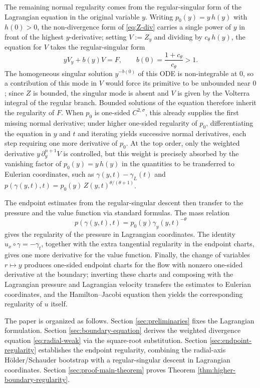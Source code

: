 \documentclass[11pt]{amsart}
\begin{document}
The remaining normal regularity comes from the regular-singular form of
the Lagrangian equation in the original variable \(y\). Writing
\(p_0(y)=y\,h(y)\) with \(h(0)>0\), the non-divergence form of
\eqref{eq:Z-div} carries a single power of \(y\) in front of the highest
\(y\)-derivative; setting \(V:=Z_y\) and dividing by \(c_\theta\,h(y)\),
the equation for \(V\) takes the regular-singular form
\[
        y V_y+b(y)V=F,\qquad
        b(0)=\frac{1+c_\theta}{c_\theta}>1 .
\]
The homogeneous singular solution \(y^{-b(0)}\) of this ODE is
non-integrable at \(0\), so a contribution of this mode in \(V\) would
force its primitive to be unbounded near \(0\); since \(Z\) is bounded,
the singular mode is absent and \(V\) is given by the Volterra integral
of the regular branch. Bounded solutions of the equation therefore
inherit the regularity of \(F\). When \(p_0\) is one-sided
\(C^{2,\sigma}\), this already supplies the first missing normal
derivative; under higher one-sided regularity of \(p_0\), differentiating
the equation in \(y\) and \(t\) and iterating yields successive normal
derivatives, each step requiring one more derivative of \(p_0\). At the
top order, only the weighted derivative \(y\,\partial_y^{n+1}V\) is
controlled, but this weight is precisely absorbed by the vanishing
factor of \(p_0(y)=y\,h(y)\) in the quantities to be transferred to
Eulerian coordinates, such as \(\gamma(y,t)-\gamma_L(t)\) and
\(p(\gamma(y,t),t)=p_0(y)\,Z(y,t)^{\theta/(\theta+1)}\). 


The endpoint estimates from the regular-singular descent then transfer to
the pressure and the value function via standard formulas. The mass relation
\begin{equation}
\label{eq:mass-relation}
        p(\gamma(y,t),t)=p_0(y)\gamma_y(y,t)^{-\theta}
\end{equation}
gives the regularity of the pressure in Lagrangian coordinates. The
identity \(u_x\circ\gamma=-\gamma_t\), together with the extra tangential
regularity in the endpoint charts, gives one more derivative for the value
function. Finally, the change of variables
\(r\mapsto y\) produces one-sided endpoint charts for the flow with nonzero
one-sided derivative at the boundary; inverting these charts and composing
with the Lagrangian pressure and Lagrangian velocity transfers the estimates
to Eulerian coordinates, and the Hamilton--Jacobi equation then yields the
corresponding regularity of \(u\) itself.

The paper is organized as follows. Section \ref{sec:preliminaries} fixes the
Lagrangian formulation. Section \ref{sec:boundary-equation} derives the
weighted divergence equation \eqref{eq:radial-weak} via the square-root
substitution. Section \ref{sec:endpoint-regularity} establishes the endpoint
regularity, combining the radial-axis H\"older/Schauder bootstrap with a
regular-singular descent in Lagrangian coordinates. Section
\ref{sec:proof-main-theorem} proves Theorem
\ref{thm:higher-boundary-regularity}.
\end{document}
